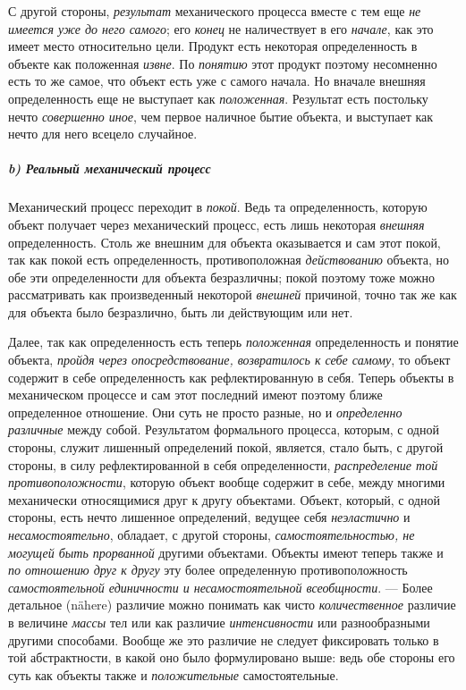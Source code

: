 \documentclass[twoside]{article}
\begin{document}
{{{{{С другой стороны,
{\em результат}
механического процесса вместе с тем еще
{\em не имеется уже до него самого};
его {\em конец}
не наличествует в его
{\em начале}, как это
имеет место относительно цели. Продукт есть некоторая определенность в
объекте как положенная {\em извне}.
По {\em понятию}
этот продукт поэтому несомненно есть то же самое, что объект
есть уже с самого начала. Но вначале внешняя определенность еще не
выступает как {\em положенная}.
Результат есть постольку нечто
{\em совершенно иное},
чем первое наличное бытие объекта, и выступает как нечто для
него всецело случайное.

\subparagraph[b) Реальный механический процесс]{b) Реальный механический процесс}
Механический процесс переходит в
{\em покой}. Ведь та
определенность, которую объект получает через механический процесс, есть
лишь некоторая {\em внешняя}
определенность. Столь же внешним для объекта оказывается и
сам этот покой, так как покой есть определенность, противоположная
{\em действованию}
объекта, но обе эти определенности для объекта безразличны;
покой поэтому тоже можно рассматривать как произведенный некоторой
{\em внешней} причиной,
точно так же как для объекта было безразлично, быть ли действующим или нет.

Далее, так как определенность есть теперь
{\em положенная}
определенность и понятие объекта,
{\em пройдя через опосредствование,
возвратилось к себе самому}, то объект содержит в себе
определенность как рефлектированную в себя. Теперь объекты в
механическом процессе и сам этот последний имеют поэтому ближе определенное
отношение. Они суть не просто разные, но и
{\em определенно различные}
между собой. Результатом формального процесса, которым, с
одной стороны, служит лишенный определений покой, является, стало быть, с
другой стороны, в силу рефлектированной в себя определенности,
{\em распределение той
противоположности}, которую объект вообще содержит в себе,
между многими механически относящимися друг к другу объектами. Объект,
который, с одной стороны, есть нечто лишенное определений, ведущее себя
{\em неэластично} и
{\em несамостоятельно},
обладает, с другой стороны,
{\em самостоятельностью, не могущей быть
прорванной }другими объектами. Объекты имеют теперь также и
{\em по отношению друг к другу}
эту более определенную противоположность
{\em самостоятельной единичности и
несамостоятельной всеобщности}. — Более детальное (nähere)
различие можно понимать как чисто
{\em количественное}
различие в величине
{\em массы} тел или как
различие {\em интенсивности}
или разнообразными другими способами. Вообще же это различие
не следует фиксировать только в той абстрактности, в какой оно было
формулировано выше: ведь обе стороны его суть как объекты также и
{\em положительные}
самостоятельные.

}}}}}
\end{document}
